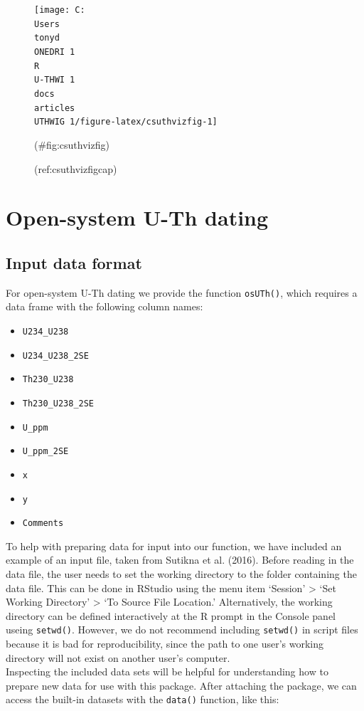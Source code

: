 \documentclass[]{elsarticle} %
\providecommand{\tightlist}{%
  \setlength{\itemsep}{0pt}\setlength{\parskip}{0pt}}
\begin{document}
\begin{figure}
\texttt{[image: C:\\Users\\tonyd\\ONEDRI~1\\R\\U-THWI~1\\docs\\articles\\UTHWIG~1/figure-latex/csuthvizfig-1]} \caption{(ref:csuthvizfigcap)}(\#fig:csuthvizfig)
\end{figure}

\FloatBarrier

\newpage

\hypertarget{open-system-u-th-dating}{%
\section{Open-system U-Th dating}\label{open-system-u-th-dating}}

\hypertarget{input-data-format-1}{%
\subsection{Input data format}\label{input-data-format-1}}

For open-system U-Th dating we provide the function \texttt{osUTh()}, which requires a data frame with the following column names:

\begin{itemize}
\tightlist
\item
  \texttt{U234\_U238}
\item
  \texttt{U234\_U238\_2SE}
\item
  \texttt{Th230\_U238}
\item
  \texttt{Th230\_U238\_2SE}
\item
  \texttt{U\_ppm}
\item
  \texttt{U\_ppm\_2SE}
\item
  \texttt{x}
\item
  \texttt{y}
\item
  \texttt{Comments}
\end{itemize}

To help with preparing data for input into our function, we have included an example of an input file, taken from Sutikna et al. (2016). Before reading in the data file, the user needs to set the working directory to the folder containing the data file. This can be done in RStudio using the menu item `Session' \textgreater{} `Set Working Directory' \textgreater{} `To Source File Location.' Alternatively, the working directory can be defined interactively at the R prompt in the Console panel useing \texttt{setwd()}. However, we do not recommend including \texttt{setwd()} in script files because it is bad for reproducibility, since the path to one user's working directory will not exist on another user's computer.\\
Inspecting the included data sets will be helpful for understanding how to prepare new data for use with this package. After attaching the package, we can access the built-in datasets with the \texttt{data()} function, like this:
\end{document}
